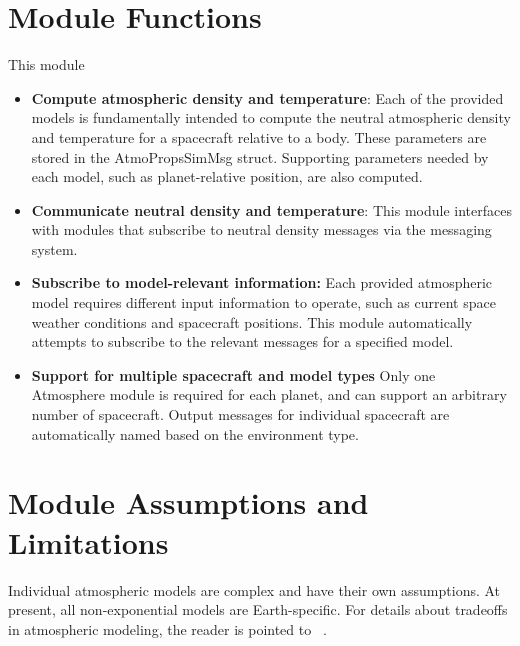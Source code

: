 

\section{Module Functions}
This module 
\begin{itemize}
	\item \textbf{Compute atmospheric density and temperature}: Each of the provided models is fundamentally intended to compute the neutral atmospheric density and temperature for a spacecraft relative to a body. These parameters are stored in the AtmoPropsSimMsg struct. Supporting parameters needed by each model, such as planet-relative position, are also computed.
	\item \textbf{Communicate neutral density and temperature}: This module interfaces with modules that subscribe to neutral density messages via the messaging system.
	\item \textbf {Subscribe to model-relevant information:} Each provided atmospheric model requires different input information to operate, such as current space weather conditions and spacecraft positions. This module automatically attempts to subscribe to the relevant messages for a specified model. 
	\item \textbf{Support for multiple spacecraft and model types} Only one Atmosphere module is required for each planet, and can support an arbitrary number of spacecraft. Output messages for individual spacecraft are automatically named based on the environment type.
\end{itemize}

\section{Module Assumptions and Limitations}
Individual atmospheric models are complex and have their own assumptions. At present, all non-exponential models are Earth-specific. For details about tradeoffs in atmospheric modeling, the reader is pointed to ~. 